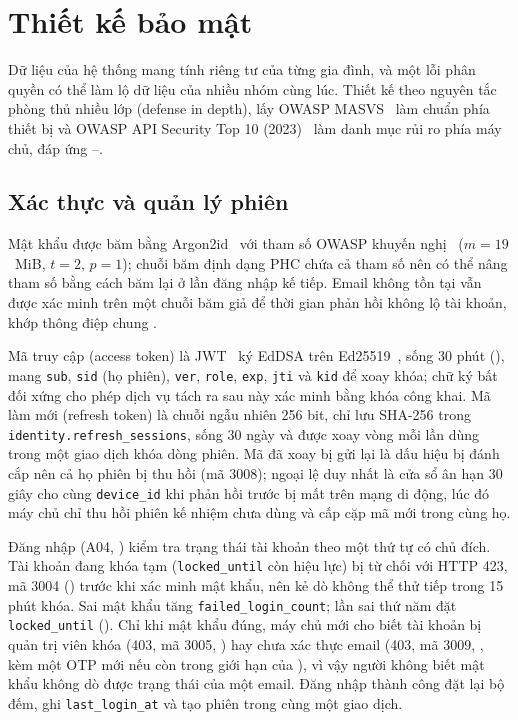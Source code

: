 \section{Thiết kế bảo mật}\label{sec:bao-mat}

Dữ liệu của hệ thống mang tính riêng tư của từng gia đình, và một lỗi phân quyền có thể làm lộ dữ liệu của nhiều nhóm cùng lúc. Thiết kế theo nguyên tắc phòng thủ nhiều lớp (defense in depth), lấy OWASP MASVS~\cite{masvs} làm chuẩn phía thiết bị và OWASP API Security Top 10 (2023)~\cite{owaspapi} làm danh mục rủi ro phía máy chủ, đáp ứng --.

\subsection{Xác thực và quản lý phiên}\label{ssec:xac-thuc-phien}

Mật khẩu được băm bằng Argon2id~\cite{rfc9106} với tham số OWASP khuyến nghị~\cite{owasppassword} ($m = 19$~MiB, $t = 2$, $p = 1$); chuỗi băm định dạng PHC chứa cả tham số nên có thể nâng tham số bằng cách băm lại ở lần đăng nhập kế tiếp. Email không tồn tại vẫn được xác minh trên một chuỗi băm giả để thời gian phản hồi không lộ tài khoản, khớp thông điệp chung .

Mã truy cập (access token) là JWT~\cite{rfc7519} ký EdDSA trên Ed25519~\cite{rfc8032}, sống 30 phút (), mang \texttt{sub}, \texttt{sid} (họ phiên), \texttt{ver}, \texttt{role}, \texttt{exp}, \texttt{jti} và \texttt{kid} để xoay khóa; chữ ký bất đối xứng cho phép dịch vụ tách ra sau này xác minh bằng khóa công khai. Mã làm mới (refresh token) là chuỗi ngẫu nhiên 256 bit, chỉ lưu SHA-256 trong \texttt{identity.refresh\_sessions}, sống 30 ngày và được xoay vòng mỗi lần dùng trong một giao dịch khóa dòng phiên. Mã đã xoay bị gửi lại là dấu hiệu bị đánh cắp nên cả họ phiên bị thu hồi (mã 3008); ngoại lệ duy nhất là cửa sổ ân hạn 30 giây cho cùng \texttt{device\_id} khi phản hồi trước bị mất trên mạng di động, lúc đó máy chủ chỉ thu hồi phiên kế nhiệm chưa dùng và cấp cặp mã mới trong cùng họ.

Đăng nhập (A04, ) kiểm tra trạng thái tài khoản theo một thứ tự có chủ đích. Tài khoản đang khóa tạm (\texttt{locked\_until} còn hiệu lực) bị từ chối với HTTP 423, mã 3004 () trước khi xác minh mật khẩu, nên kẻ dò không thể thử tiếp trong 15 phút khóa. Sai mật khẩu tăng \texttt{failed\_login\_count}; lần sai thứ năm đặt \texttt{locked\_until} (). Chỉ khi mật khẩu đúng, máy chủ mới cho biết tài khoản bị quản trị viên khóa (403, mã 3005, ) hay chưa xác thực email (403, mã 3009, , kèm một OTP mới nếu còn trong giới hạn của ), vì vậy người không biết mật khẩu không dò được trạng thái của một email. Đăng nhập thành công đặt lại bộ đếm, ghi \texttt{last\_login\_at} và tạo phiên trong cùng một giao dịch.

